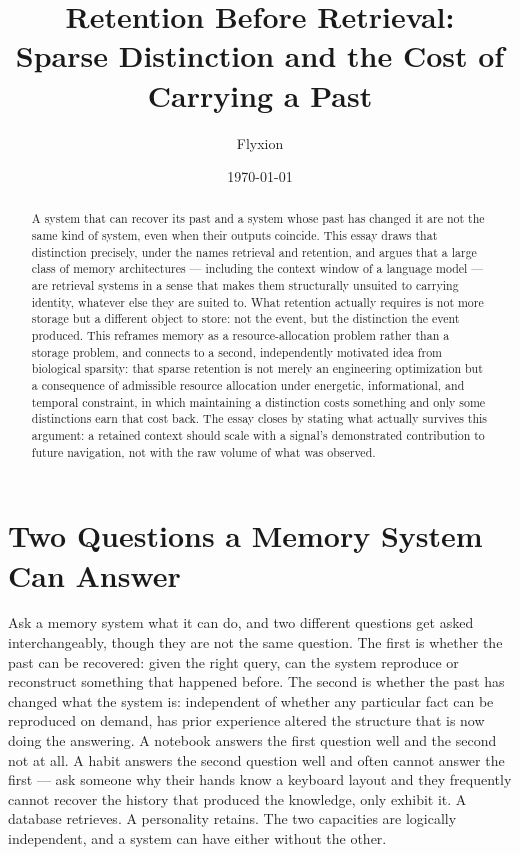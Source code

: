 \documentclass[11pt]{amsart}
\title{Retention Before Retrieval: \\
Sparse Distinction and the Cost of Carrying a Past}
\author{Flyxion}
\date{\today}
\theoremstyle{plain}
\theoremstyle{definition}
\theoremstyle{remark}
\begin{document}
\maketitle

\begin{abstract}
A system that can recover its past and a system whose past has changed
it are not the same kind of system, even when their outputs coincide.
This essay draws that distinction precisely, under the names retrieval
and retention, and argues that a large class of memory architectures
--- including the context window of a language model --- are retrieval
systems in a sense that makes them structurally unsuited to carrying
identity, whatever else they are suited to. What retention actually
requires is not more storage but a different object to store: not the
event, but the distinction the event produced. This reframes memory as
a resource-allocation problem rather than a storage problem, and
connects to a second, independently motivated idea from biological
sparsity: that sparse retention is not merely an engineering
optimization but a consequence of admissible resource allocation under
energetic, informational, and temporal constraint, in which maintaining
a distinction costs something and only some distinctions earn that
cost back. The essay closes by stating what actually survives this
argument: a retained context should scale with a signal's demonstrated
contribution to future navigation, not with the raw volume of what was
observed.
\end{abstract}

\newpage
\section{Two Questions a Memory System Can Answer}

Ask a memory system what it can do, and two different questions get
asked interchangeably, though they are not the same question. The
first is whether the past can be recovered: given the right query, can
the system reproduce or reconstruct something that happened before. The
second is whether the past has changed what the system is: independent
of whether any particular fact can be reproduced on demand, has prior
experience altered the structure that is now doing the answering. A
notebook answers the first question well and the second not at all. A
habit answers the second question well and often cannot answer the
first --- ask someone why their hands know a keyboard layout and they
frequently cannot recover the history that produced the knowledge, only
exhibit it. A database retrieves. A personality retains. The two
capacities are logically independent, and a system can have either
without the other.
\end{document}
